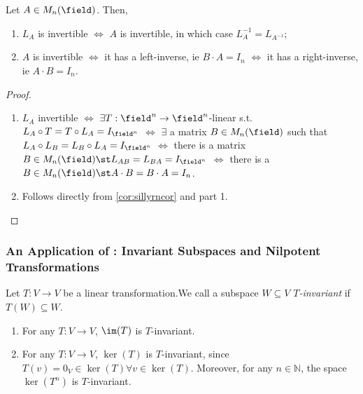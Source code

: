 \begin{proposition}
    Let $A \in M_n(\field)$. Then, \begin{enumerate}
        \item $L_A$ is invertible $\iff$ $A$ is invertible, in which case $L_A^{-1} = L_{A^{-1}}$;
        \item $A$ is invertible $\iff$ it has a left-inverse, ie $B \cdot A = I_n$ $\iff$ it has a right-inverse, ie $A \cdot B = I_n$.
    \end{enumerate}
\end{proposition}

\begin{proof}
    \begin{enumerate}
        \item $L_A$ invertible $\iff$ $\exists T:\field^n \to \field^n$-linear s.t. $L_A \circ T = T \circ L_A = I_{\field^n}$ $\iff$ $\exists$ a matrix $B \in M_n(\field)$ such that $L_A \circ L_B = L_B \circ L_A = I_{\field^n}$ $\iff$ there is a matrix $B \in M_n(\field) \st L_{AB} = L_{BA} = I_{\field^n}$ $\iff$ there is a $B \in M_{n}(\field) \st A \cdot B = B \cdot A = I_n$.
        \item Follows directly from \cref{cor:sillyrncor} and part 1.
    \end{enumerate}
\end{proof}

\subsubsection{An Application of : Invariant Subspaces and Nilpotent Transformations}

\begin{definition}[$T$-Invariant]
    Let $T : V \to V$ be a linear transformation.\footnotemark We call a subspace $W \subseteq V$ \emph{$T$-invariant} if $T(W) \subseteq W$.
\end{definition}
\begin{example}
    \begin{enumerate}
        \item For any $T : V \to V$, $\im(T)$ is $T$-invariant.
        \item For any $T:V \to V$, $\ker(T)$ is $T$-invariant, since $T(v) = 0_V \in \ker(T) \forall v \in \ker(T)$. Moreover, for any $n \in \mathbb{N}$, the space $\ker(T^n)$ is $T$-invariant.\footnotemark 
    \end{enumerate}
\end{example}

